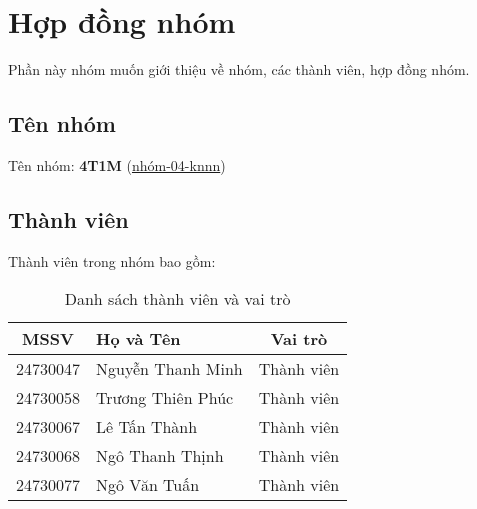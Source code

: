 \documentclass[12pt]{report}
\begin{document}
\tableofcontents

\chapter{Hợp đồng nhóm}
\label{sec:group_contract}
Phần này nhóm muốn giới thiệu về nhóm, các thành viên, hợp đồng nhóm.

\section{Tên nhóm}
Tên nhóm: \textbf{4T1M} (\href{https://ss004e11cn1.slack.com/archives/C07T94K918U}{nhóm-04-knnn})

\section{Thành viên}
Thành viên trong nhóm bao gồm:
\begin{table}[h!]
    \centering
    \begin{tabular}{|c|l|c|}
        \hline
        \rule{0pt}{13pt} \textbf{MSSV}      &
        \rule{0pt}{13pt} \textbf{Họ và Tên} &
        \rule{0pt}{13pt} \textbf{Vai trò}                                    \\
        \hline
        24730047                            & Nguyễn Thanh Minh & Thành viên \\
        24730058                            & Trương Thiên Phúc & Thành viên \\
        24730067                            & Lê Tấn Thành      & Thành viên \\
        24730068                            & Ngô Thanh Thịnh   & Thành viên \\
        24730077                            & Ngô Văn Tuấn      & Thành viên \\
        \hline
    \end{tabular}
    \caption{Danh sách thành viên và vai trò}
    \label{tab:group_members}
\end{table}
\end{document}
